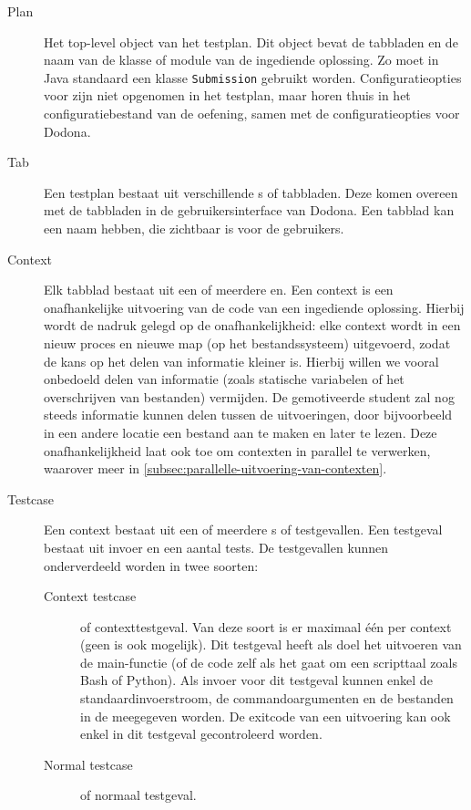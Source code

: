 \begin{description}
    \item[Plan] Het top-level object van het testplan.
    Dit object bevat de tabbladen en de naam van de klasse of module van de ingediende oplossing.
    Zo moet in Java standaard een klasse \texttt{Submission} gebruikt worden.
    Configuratieopties voor \tested{} zijn niet opgenomen in het testplan, maar horen thuis in het configuratiebestand van de oefening, samen met de configuratieopties voor Dodona.
    \item[Tab] Een testplan bestaat uit verschillende s of tabbladen.
    Deze komen overeen met de tabbladen in de gebruikersinterface van Dodona.
    Een tabblad kan een naam hebben, die zichtbaar is voor de gebruikers.
    \item[Context] Elk tabblad bestaat uit een of meerdere en.
    Een context is een onafhankelijke uitvoering van de code van een ingediende oplossing.
    Hierbij wordt de nadruk gelegd op de onafhankelijkheid: elke context wordt in een nieuw proces en nieuwe map (op het bestandssysteem) uitgevoerd, zodat de kans op het delen van informatie kleiner is.
    Hierbij willen we vooral onbedoeld delen van informatie (zoals statische variabelen of het overschrijven van bestanden) vermijden.
    De gemotiveerde student zal nog steeds informatie kunnen delen tussen de uitvoeringen, door bijvoorbeeld in een andere locatie een bestand aan te maken en later te lezen.
    Deze onafhankelijkheid laat ook toe om contexten in parallel te verwerken, waarover meer in \cref{subsec:parallelle-uitvoering-van-contexten}.
    \item[Testcase] Een context bestaat uit een of meerdere s of testgevallen.
    Een testgeval bestaat uit invoer en een aantal tests.
    De testgevallen kunnen onderverdeeld worden in twee soorten:
    \begin{description}
        \item[Context testcase] of contexttestgeval.
        Van deze soort is er maximaal één per context (geen is ook mogelijk).
        Dit testgeval heeft als doel het uitvoeren van de main-functie (of de code zelf als het gaat om een scripttaal zoals Bash of Python).
        Als invoer voor dit testgeval kunnen enkel de standaardinvoerstroom, de commandoargumenten en de bestanden in de  meegegeven worden.
        De exitcode van een uitvoering kan ook enkel in dit testgeval gecontroleerd worden.
        \item[Normal testcase] of normaal testgeval.

\end{description}
\end{description}
